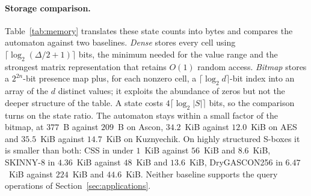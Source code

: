 \documentclass[runningheads]{llncs}
\begin{document}
\paragraph{Storage comparison.}
Table~\ref{tab:memory} translates these state counts into bytes and compares the
automaton against two baselines. \emph{Dense} stores every cell using
$\lceil\log_2(\Delta/2+1)\rceil$ bits, the minimum needed for the value range and
the strongest matrix representation that retains $O(1)$ random access.
\emph{Bitmap} stores a $2^{2n}$-bit presence map plus, for each nonzero cell, a
$\lceil\log_2 d\rceil$-bit index into an array of the $d$ distinct values; it
exploits the abundance of zeros but not the deeper structure of the table. A
state costs $4\lceil\log_{2}|S|\rceil$ bits, so the comparison turns on the
state ratio. The automaton stays within a small factor of the bitmap, at $377$~B against
$209$~B on Ascon, $34.2$~KiB against $12.0$~KiB on AES and $35.5$~KiB against
$14.7$~KiB on Kuznyechik. On highly structured S-boxes it is smaller than both:
CSS in under $1$~KiB against $56$~KiB and $8.6$~KiB, SKINNY-8 in $4.36$~KiB
against $48$~KiB and $13.6$~KiB, DryGASCON256 in $6.47$~KiB against $224$~KiB
and $44.6$~KiB. Neither baseline supports the query operations of
Section~\ref{sec:applications}.
\end{document}
